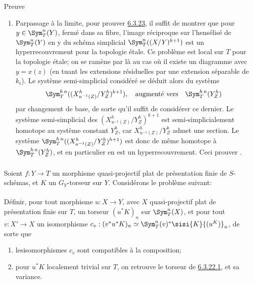 \begin{enonce*}[remark]{Preuve}
\begin{enumerate}
\item Par\pageoriginale passage à la limite, pour prouver \hyperref[XVII.prop6.3.23]{6.3.23}, il
suffit de montrer que pour $y\in \Sym^{n}_{T}(Y)$, fermé dans sa
fibre, l'image réciproque sur l'hensélisé de $\Sym^{n}_{T}(Y)$ en y du
schéma simplicial $\Sym^{n}_{T}((X/Y)^{k+1})$ est un hyperrecouvrement
pour la topologie étale. Ce problème est local sur $T$ pour la
topologie étale; on se ramène par là au cas où il existe un diagramme
 avec $y=x(z)$ (en tuant les extensions résiduelles par une
extension séparable de $k_{t}$). Le système semi-simplicial considéré
se déduit alors du système
$$
\Sym^{h\,n}_{T}((X^{h}_{u^{-1}(Z)}/Y^{h}_{Z})^{k+1}),\quad\mbox{\rm
augmenté vers}\quad \Sym^{h\,n}_{T}(Y^{h}_{Z})
$$
par changement de base, de sorte qu'il suffit de considérer ce
dernier. Le système semi-simplicial des
$(X^{h}_{u^{-1}(Z)}/Y^{h}_{Z})^{k+1}$ est semi-simplicialement
homotope au système constant $Y^{h}_{Z}$, car
$X^{h}_{u^{-1}(Z)}/Y^{h}_{Z}$ admet une section. Le système
$\Sym^{h\,n}_{T}((X^{h}_{u^{-1}(Z)}/Y^{h}_{Z})^{h+1})$ est donc de même
homotope à $\Sym^{h\, n}_{T} (Y^{h}_{Z})$, et en particulier en est
un hyperrecouvrement. Ceci prouver .
\end{enumerate}
\end{enonce*}

\subsubsection{}
Soient $f:Y\rightarrow T$ un morphisme quasi-projectif plat de
présentation finie de $S$-schémas, et $K$ un $G_{Y}$-torseur sur
$Y$. Considérons le problème suivant:

\setcounter{paragraph}{-1}
\paragraph{}
Définir, pour tout morphisme $u:X\rightarrow Y$, avec $X$
quasi-projectif plat de présentation finie sur $T$, un torseur
$(u^{\ast}K)_{n}$ sur $\Sym^{n}_{T}(X)$, et pour tout $v:X'\rightarrow
X$ un isomorphisme $c_{v}:(v^{\ast}u^{\ast}K)_{n}\simeq
\Sym^{n}_{T}(v)^{\ast}\sisi{K}{(u^K)}_{n}$, de sorte que
\begin{enumerate}
\renewcommand{\theenumi}{\roman{enumi}}
\renewcommand{\labelenumi}{(\theenumi)}
\item les\pageoriginale isomorphismes $c_{v}$ sont compatibles à la
  composition;

\item pour $u^{\ast}K$ localement trivial sur $T$, on retrouve le
torseur de \hyperref[XVII.lem6.3.22.1]{6.3.22.1}, et sa variance.
\end{enumerate}

